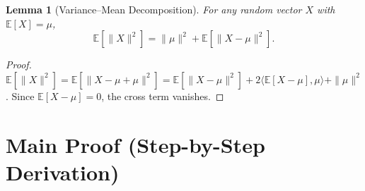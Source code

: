 \documentclass{article}
\newtheorem{lemma}{Lemma}
\begin{document}
\begin{lemma}[Variance--Mean Decomposition]\label{lem:decomp}
For any random vector $X$ with $\mathbb{E}[X] = \mu$,
\[
\mathbb{E}[\|X\|^2] = \|\mu\|^2 + \mathbb{E}[\|X - \mu\|^2].
\]
\end{lemma}

\begin{proof}
$\mathbb{E}[\|X\|^2] = \mathbb{E}[\|X-\mu+\mu\|^2] = \mathbb{E}[\|X-\mu\|^2] + 2\langle \mathbb{E}[X-\mu],\mu\rangle + \|\mu\|^2$.
Since $\mathbb{E}[X-\mu]=0$, the cross term vanishes.
\end{proof}

\section*{Main Proof (Step-by-Step Derivation)}
\end{document}
